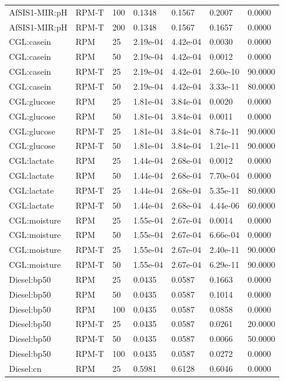\begin{tabular}{lllllll}
AfSIS1-MIR:pH & RPM-T & 100 & 0.1348 & 0.1567 & 0.2007 & 0.0000 \\
AfSIS1-MIR:pH & RPM-T & 200 & 0.1348 & 0.1567 & 0.1657 & 0.0000 \\
CGL:casein & RPM & 25 & 2.19e-04 & 4.42e-04 & 0.0030 & 0.0000 \\
CGL:casein & RPM & 50 & 2.19e-04 & 4.42e-04 & 0.0012 & 0.0000 \\
CGL:casein & RPM-T & 25 & 2.19e-04 & 4.42e-04 & 2.60e-10 & 90.0000 \\
CGL:casein & RPM-T & 50 & 2.19e-04 & 4.42e-04 & 3.33e-11 & 80.0000 \\
CGL:glucose & RPM & 25 & 1.81e-04 & 3.84e-04 & 0.0020 & 0.0000 \\
CGL:glucose & RPM & 50 & 1.81e-04 & 3.84e-04 & 0.0011 & 0.0000 \\
CGL:glucose & RPM-T & 25 & 1.81e-04 & 3.84e-04 & 8.74e-11 & 90.0000 \\
CGL:glucose & RPM-T & 50 & 1.81e-04 & 3.84e-04 & 1.21e-11 & 90.0000 \\
CGL:lactate & RPM & 25 & 1.44e-04 & 2.68e-04 & 0.0012 & 0.0000 \\
CGL:lactate & RPM & 50 & 1.44e-04 & 2.68e-04 & 7.70e-04 & 0.0000 \\
CGL:lactate & RPM-T & 25 & 1.44e-04 & 2.68e-04 & 5.35e-11 & 80.0000 \\
CGL:lactate & RPM-T & 50 & 1.44e-04 & 2.68e-04 & 4.44e-06 & 60.0000 \\
CGL:moisture & RPM & 25 & 1.55e-04 & 2.67e-04 & 0.0014 & 0.0000 \\
CGL:moisture & RPM & 50 & 1.55e-04 & 2.67e-04 & 6.66e-04 & 0.0000 \\
CGL:moisture & RPM-T & 25 & 1.55e-04 & 2.67e-04 & 2.40e-11 & 90.0000 \\
CGL:moisture & RPM-T & 50 & 1.55e-04 & 2.67e-04 & 6.29e-11 & 90.0000 \\
Diesel:bp50 & RPM & 25 & 0.0435 & 0.0587 & 0.1663 & 0.0000 \\
Diesel:bp50 & RPM & 50 & 0.0435 & 0.0587 & 0.1014 & 0.0000 \\
Diesel:bp50 & RPM & 100 & 0.0435 & 0.0587 & 0.0858 & 0.0000 \\
Diesel:bp50 & RPM-T & 25 & 0.0435 & 0.0587 & 0.0261 & 20.0000 \\
Diesel:bp50 & RPM-T & 50 & 0.0435 & 0.0587 & 0.0066 & 50.0000 \\
Diesel:bp50 & RPM-T & 100 & 0.0435 & 0.0587 & 0.0272 & 0.0000 \\
Diesel:cn & RPM & 25 & 0.5981 & 0.6128 & 0.6046 & 0.0000 \\

\end{tabular}
